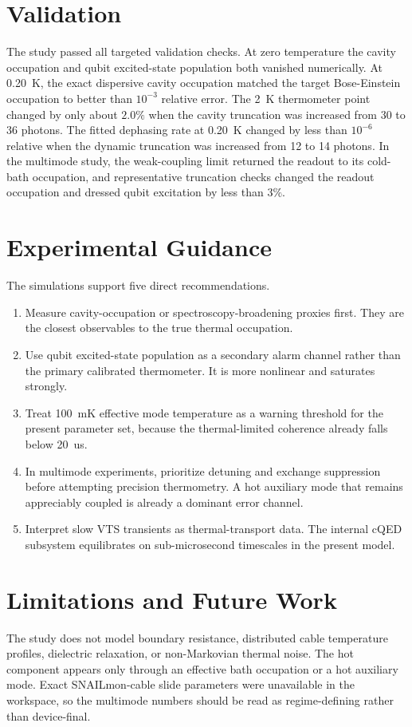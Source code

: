 \documentclass[11pt]{article}
\begin{document}
\section{Validation}
The study passed all targeted validation checks. At zero temperature the cavity occupation and qubit excited-state population both vanished numerically. At \SI{0.20}{K}, the exact dispersive cavity occupation matched the target Bose-Einstein occupation to better than \(10^{-3}\) relative error. The \SI{2}{K} thermometer point changed by only about \(2.0\%\) when the cavity truncation was increased from 30 to 36 photons. The fitted dephasing rate at \SI{0.20}{K} changed by less than \(10^{-6}\) relative when the dynamic truncation was increased from 12 to 14 photons. In the multimode study, the weak-coupling limit returned the readout to its cold-bath occupation, and representative truncation checks changed the readout occupation and dressed qubit excitation by less than \(3\%\).

\section{Experimental Guidance}
The simulations support five direct recommendations.

\begin{enumerate}
\item Measure cavity-occupation or spectroscopy-broadening proxies first. They are the closest observables to the true thermal occupation.
\item Use qubit excited-state population as a secondary alarm channel rather than the primary calibrated thermometer. It is more nonlinear and saturates strongly.
\item Treat \SI{100}{mK} effective mode temperature as a warning threshold for the present parameter set, because the thermal-limited coherence already falls below \SI{20}{us}.
\item In multimode experiments, prioritize detuning and exchange suppression before attempting precision thermometry. A hot auxiliary mode that remains appreciably coupled is already a dominant error channel.
\item Interpret slow VTS transients as thermal-transport data. The internal cQED subsystem equilibrates on sub-microsecond timescales in the present model.
\end{enumerate}

\section{Limitations and Future Work}
The study does not model boundary resistance, distributed cable temperature profiles, dielectric relaxation, or non-Markovian thermal noise. The hot component appears only through an effective bath occupation or a hot auxiliary mode. Exact SNAILmon-cable slide parameters were unavailable in the workspace, so the multimode numbers should be read as regime-defining rather than device-final.
\end{document}
